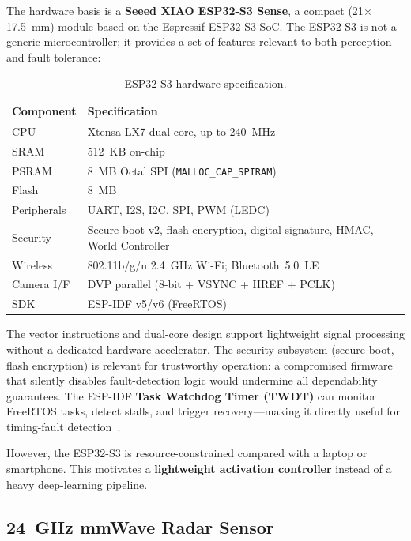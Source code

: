 \documentclass[12pt]{extarticle}
\begin{document}
The hardware basis is a \textbf{Seeed XIAO ESP32-S3 Sense}, a compact
(21$\times$17.5~mm) module based on the Espressif ESP32-S3 SoC.
The ESP32-S3 is not a generic microcontroller; it provides a set of features relevant
to both perception and fault tolerance:

\begin{table}[H]
\centering
\caption{ESP32-S3 hardware specification.}
\label{tab:esp32}
\small
\begin{tabular}{ll}
\toprule
\textbf{Component} & \textbf{Specification}\\
\midrule
CPU          & Xtensa LX7 dual-core, up to 240~MHz\\
SRAM         & 512~KB on-chip\\
PSRAM        & 8~MB Octal SPI (\texttt{MALLOC\_CAP\_SPIRAM})\\
Flash        & 8~MB\\
Peripherals  & UART, I2S, I2C, SPI, PWM (LEDC)\\
Security     & Secure boot v2, flash encryption, digital signature, HMAC, World Controller\\
Wireless     & 802.11b/g/n 2.4~GHz Wi-Fi; Bluetooth~5.0~LE\\
Camera I/F   & DVP parallel (8-bit + VSYNC + HREF + PCLK)\\
SDK          & ESP-IDF v5/v6 (FreeRTOS)\\
\bottomrule
\end{tabular}
\end{table}

The vector instructions and dual-core design support lightweight signal processing
without a dedicated hardware accelerator.
The security subsystem (secure boot, flash encryption) is relevant for trustworthy
operation: a compromised firmware that silently disables fault-detection logic would
undermine all dependability guarantees.
The ESP-IDF \textbf{Task Watchdog Timer (TWDT)} can monitor FreeRTOS tasks, detect
stalls, and trigger recovery---making it directly useful for timing-fault
detection~\cite{espressif_watchdog}.

However, the ESP32-S3 is resource-constrained compared with a laptop or smartphone.
This motivates a \textbf{lightweight activation controller} instead of a heavy
deep-learning pipeline.

\subsection{24~GHz mmWave Radar Sensor}
\end{document}
